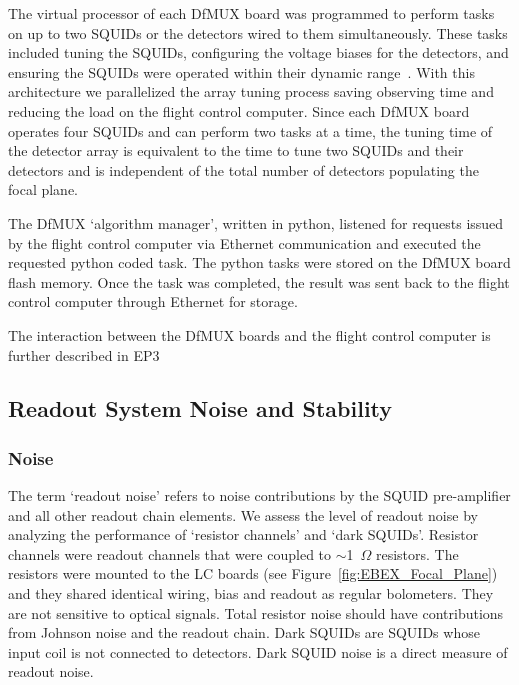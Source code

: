 \documentclass[../EBEXPaper2.tex]{subfiles}
\begin{document}
The virtual processor of each \ac{DfMUX} board was programmed to perform tasks on up to two \ac{SQUID}s or the detectors wired to them simultaneously.
These tasks included tuning the \ac{SQUID}s, configuring the voltage biases for the detectors, and ensuring the \ac{SQUID}s were operated within their dynamic range~\citep{macdermid_aip2009}.
With this architecture we parallelized the array tuning process saving observing time and reducing the load on the flight control computer.
Since each \ac{DfMUX} board operates four \ac{SQUID}s and can perform two tasks at a time, the tuning time of the detector array is equivalent to the time to tune two \ac{SQUID}s and their detectors and is independent of the total number of detectors populating the focal plane.

The \ac{DfMUX} `algorithm manager', written in python, listened for requests issued by the flight control computer via Ethernet communication and executed the requested python coded task.
The python tasks were stored on the \ac{DfMUX} board flash memory.
Once the task was completed, the result was sent back to the flight control computer through Ethernet for storage.

The interaction between the \ac{DfMUX} boards and the flight control computer is further described in \ac{EP3}


\subsection{Readout System Noise and Stability}
\label{sec:readout_performance}

\subsubsection{Noise}
\label{readoutnoise} 

The term `readout noise' refers to noise contributions by the \ac{SQUID} pre-amplifier and all other readout chain elements. 
We assess the level of readout noise by analyzing the performance of `resistor channels' and `dark \ac{SQUID}s'.
Resistor channels were readout channels that were coupled to $\sim$1~$\Omega$ resistors.
The resistors were mounted to the \ac{LC} boards (see Figure~\ref{fig:EBEX_Focal_Plane}) and they shared identical wiring, bias and readout as regular bolometers.
They are not sensitive to optical signals.
Total resistor noise should have contributions from Johnson noise and the readout chain.
Dark \ac{SQUID}s are \ac{SQUID}s whose input coil is not connected to detectors. 
Dark \ac{SQUID} noise is a direct measure of readout noise. 
\end{document}
